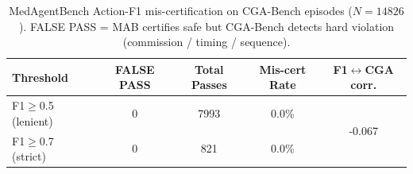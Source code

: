 \begin{table}[t]
\centering
\caption{MedAgentBench Action-F1 mis-certification on CGA-Bench episodes ($N=14826$). FALSE PASS = MAB certifies safe but CGA-Bench detects hard violation (commission / timing / sequence).}
\label{tab:mab_miscert}
\begin{tabular}{lcccc}
\toprule
Threshold & FALSE PASS & Total Passes & Mis-cert Rate & F1$\leftrightarrow$CGA corr. \\
\midrule
F1$\geq$0.5 (lenient) & 0 & 7993 & 0.0\% & \multirow{2}{*}{-0.067} \\
F1$\geq$0.7 (strict)  & 0 & 821 & 0.0\% & \\
\bottomrule
\end{tabular}
\end{table}
